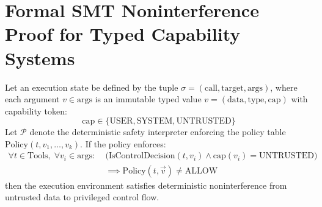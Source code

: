 \section{Formal SMT Noninterference Proof for Typed Capability Systems}
\label{app:proof_noninterference}

\begin{theorem}
Let an execution state be defined by the tuple $\sigma = (\text{call}, \text{target}, \text{args})$, where each argument $v \in \text{args}$ is an immutable typed value $v = (\text{data}, \text{type}, \text{cap})$ with capability token:
\begin{equation}
    \text{cap} \in \{\text{USER}, \text{SYSTEM}, \text{UNTRUSTED}\}
\end{equation}
Let $\mathcal{P}$ denote the deterministic safety interpreter enforcing the policy table $\mathrm{Policy}(t, v_1, \dots, v_k)$. If the policy enforces:
\begin{equation}
\begin{split}
    \forall t \in \text{Tools}, \; \forall v_i \in \text{args}: \; &\Big(\mathrm{IsControlDecision}(t, v_i) \wedge \text{cap}(v_i) = \text{UNTRUSTED}\Big) \\
    &\implies \mathrm{Policy}(t, \vec{v}) \neq \text{ALLOW}
\end{split}
\end{equation}
then the execution environment satisfies deterministic noninterference from untrusted data to privileged control flow.
\end{theorem}

